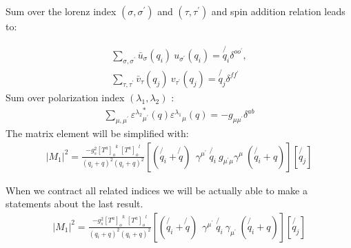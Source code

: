 Sum over the lorenz index $({\sigma},{\sigma}^{\prime})$ and $({\tau},{\tau}^{\prime})$ and spin addition relation leads to:
 
\begin{equation}
\begin{split}
\displaystyle\sum\limits_{{\sigma},{\sigma}^{\prime}} {\bar{u}}_{\sigma}(q_i)\:u_{{\sigma}^{\prime}}(q_i) = \not{q_i} \delta^{{o}{o}^{\prime}},\\
\displaystyle\sum\limits_{{\tau},{\tau}^{\prime}} {\bar{v}}_{\tau}(q_j)\:v_{{\tau}^{\prime}}(q_j) = \not{q_j} \delta^{{f}{f}^{\prime}}
\end{split}
\end{equation}
Sum over polarization index $({\lambda_{1}},{\lambda}_{2})$ :
\begin{equation}
\begin{split}
 \displaystyle\sum\limits_{{\mu},{\mu}^{\prime}} {{\varepsilon^{\lambda_2}}_{{\mu}^{\prime}}^* (q) {\varepsilon^{\lambda_1}}_{\mu} (q)} = -g_{{\mu}{\mu}^{\prime}} \delta^{{a}{b}}
\end{split}
\end{equation}
The matrix element will be simplified with: 
\begin{equation}
\begin{split}
|M_1|^2=\frac{-g_s^2  {[T^a]_{o}}^k \: {[T^a]_o}^l }{(q_i + q)^2 (q_i + q)^2}
[(\not{q_i} + \not{q}) \:
 \:  \gamma^{{\mu}^{\prime}} \: \not{q_i} \: g_{{{\mu}^{\prime}}{\mu}} 
\gamma^{\mu} \: (\not{q_i} + q)]
[\not{q_j}]
\end{split}
\end{equation}

When we contract all related indices we will be actually able to make a statements about the last result.
\begin{equation}
\begin{split}
|M_1|^2=\frac{-g_s^2  {[T^a]_{o}}^k \: {[T^a]_o}^l }{(q_i + q)^2 (q_i + q)^2}
[(\not{q_i} + \not{q}) \:
 \:  \gamma^{{\mu}^{\prime}} \: \not{q_i} \: 
\gamma_{{\mu}^{\prime}} \: (\not{q_i} + q)]
[\not{q_j}]
\end{split}
\end{equation}

